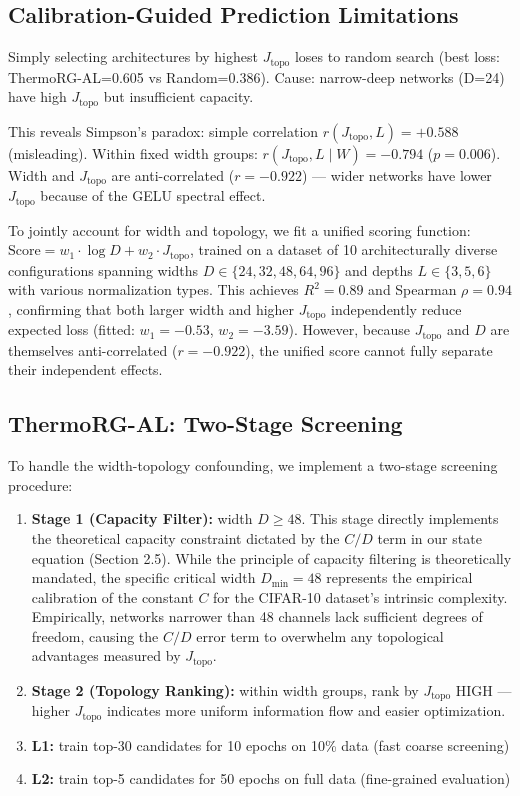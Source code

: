 \documentclass[11pt, a4paper]{article}
\theoremstyle{plain}
\begin{document}
\subsection{Calibration-Guided Prediction Limitations}

Simply selecting architectures by highest $J_{\mathrm{topo}}$ loses to random search (best loss: ThermoRG-AL=0.605 vs Random=0.386). Cause: narrow-deep networks (D=24) have high $J_{\mathrm{topo}}$ but insufficient capacity.

This reveals Simpson's paradox: simple correlation $r(J_{\mathrm{topo}}, L) = +0.588$ (misleading). Within fixed width groups: $r(J_{\mathrm{topo}}, L \mid W) = -0.794$ ($p=0.006$). Width and $J_{\mathrm{topo}}$ are anti-correlated ($r = -0.922$) --- wider networks have lower $J_{\mathrm{topo}}$ because of the GELU spectral effect.

To jointly account for width and topology, we fit a unified scoring function: $\mathrm{Score} = w_1 \cdot \log D + w_2 \cdot J_{\mathrm{topo}}$, trained on a dataset of 10 architecturally diverse configurations spanning widths $D \in \{24, 32, 48, 64, 96\}$ and depths $L \in \{3, 5, 6\}$ with various normalization types. This achieves $R^2 = 0.89$ and Spearman $\rho = 0.94$, confirming that both larger width and higher $J_{\mathrm{topo}}$ independently reduce expected loss (fitted: $w_1 = -0.53$, $w_2 = -3.59$). However, because $J_{\mathrm{topo}}$ and $D$ are themselves anti-correlated ($r = -0.922$), the unified score cannot fully separate their independent effects.

\subsection{ThermoRG-AL: Two-Stage Screening}

To handle the width-topology confounding, we implement a two-stage screening procedure:
\begin{enumerate}
\item \textbf{Stage 1 (Capacity Filter):} width $D \ge 48$. This stage directly implements the theoretical capacity constraint dictated by the $C/D$ term in our state equation (Section 2.5). While the principle of capacity filtering is theoretically mandated, the specific critical width $D_{\min} = 48$ represents the empirical calibration of the constant $C$ for the CIFAR-10 dataset's intrinsic complexity. Empirically, networks narrower than 48 channels lack sufficient degrees of freedom, causing the $C/D$ error term to overwhelm any topological advantages measured by $J_{\mathrm{topo}}$.
\item \textbf{Stage 2 (Topology Ranking):} within width groups, rank by $J_{\mathrm{topo}}$ HIGH --- higher $J_{\mathrm{topo}}$ indicates more uniform information flow and easier optimization.
\item \textbf{L1:} train top-30 candidates for 10 epochs on 10\% data (fast coarse screening)
\item \textbf{L2:} train top-5 candidates for 50 epochs on full data (fine-grained evaluation)
\end{enumerate}
\end{document}

